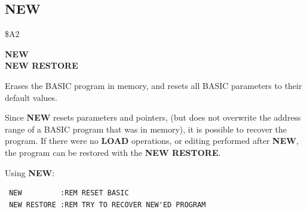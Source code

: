 \subsection{NEW}
\begin{description}[leftmargin=2cm,style=nextline]
\item [Token:] \$A2
\item [Format:] {\bf NEW} \\
                {\bf NEW RESTORE}
\item [Usage:]  Erases the BASIC program in memory, and resets all BASIC
                parameters to their default values.

                Since {\bf NEW} resets parameters and pointers,
                (but does not overwrite the address
                range of a BASIC program that was in memory),
                it is possible to recover the
                program. If there were no {\bf LOAD} operations,
                or editing performed after {\bf NEW}, the program
                can be restored with the {\bf NEW RESTORE}.
\item [Examples:] Using {\bf NEW}:
\begin{tcolorbox}[colback=black,coltext=white]
\verbatimfont{\codefont}
\begin{verbatim}
 NEW         :REM RESET BASIC
 NEW RESTORE :REM TRY TO RECOVER NEW'ED PROGRAM
\end{verbatim}
\end{tcolorbox}
\end{description}


\newpage
